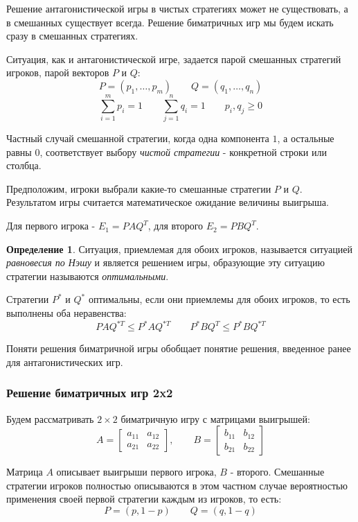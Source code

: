 \documentclass[aps,%
12pt,%
final,%
oneside,
onecolumn,%
musixtex, %
superscriptaddress,%
centertags]{article} %
\theoremstyle{plain}
\theoremstyle{definition}
\newtheorem{definition}{Определение}[subsection]
\theoremstyle{remark}
\begin{document}
Решение антагонистической игры в чистых стратегиях может не существовать, а в смешанных существует всегда. Решение биматричных игр мы будем искать сразу в смешанных стратегиях.

Ситуация, как и антагонистической игре, задается парой смешанных стратегий игроков, парой векторов $P$ и $Q$:
$$P = (p_1,\ldots,p_m) \qquad Q = (q_1,\ldots,q_n)$$
$$\sum\limits_{i=1}^m p_i = 1 \qquad \sum\limits_{j=1}^n q_i = 1 \qquad p_i,q_j \geq 0$$

Частный случай смешанной стратегии, когда одна компонента $1$, а остальные равны $0$, соответствует выбору \textit{чистой стратегии} - конкретной строки или столбца.

Предположим, игроки выбрали какие-то смешанные стратегии $P$ и $Q$. Результатом игры считается математическое ожидание величины выигрыша. 

Для первого игрока - $E_1 = PAQ^T$, для второго $E_2 = PBQ^T$. 

\begin{definition}
  Ситуация, приемлемая для обоих игроков, называется ситуацией \textit{равновесия по Нэшу} и является решением игры, образующие эту ситуацию стратегии называются \textit{оптимальными}.
\end{definition}

Стратегии $P^*$ и $Q^*$ оптимальны, если они приемлемы для обоих игроков, то есть выполнены оба неравенства:
$$PAQ^{*T} \leq P^*AQ^{*T} \qquad P^*BQ^{T} \leq P^*BQ^{*T}$$

Поняти решения биматричной игры обобщает понятие решения, введенное ранее для антагонистических игр.

\subsubsection{Решение биматричных игр 2x2}

Будем рассматривать $2\times 2$ биматричную игру с матрицами выигрышей:
$$A = \begin{bmatrix}
  a_{11} & a_{12} \\
  a_{21} & a_{22}
\end{bmatrix}, \qquad B = \begin{bmatrix}
  b_{11} & b_{12} \\
  b_{21} & b_{22}
\end{bmatrix}$$

Матрица $A$ описывает выигрыши первого игрока, $B$ - второго. Смешанные стратегии игроков полностью описываются в этом частном случае вероятностью применения своей первой стратегии каждым из игроков, то есть:
$$P = (p,1-p) \qquad Q = (q,1-q)$$
\end{document}
